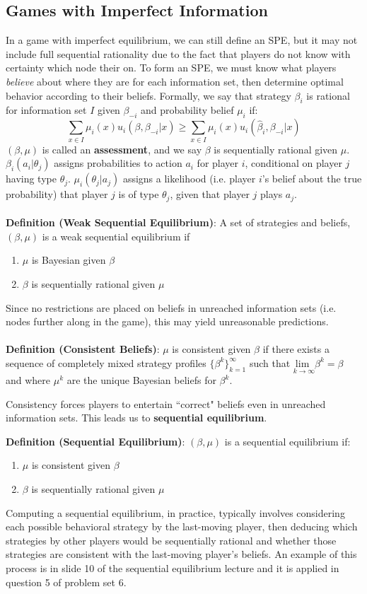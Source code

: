 \documentclass{article}
\newcommand{\red}[1]{{\color{red}#1}}
\begin{document}
\subsection{Games with Imperfect Information}
In a game with imperfect equilibrium, we can still define an SPE, but it may not include full sequential rationality due to the fact that players do not know with certainty which node their on. To form an SPE, we must know what players \textit{believe} about where they are for each information set, then determine optimal behavior according to their beliefs. Formally, we say that strategy $\beta_i$ is rational for information set $I$ given $\beta_{-i}$ and probability belief $\mu_i$ if:
\[
	\sum_{x\in I}\mu_i(x)u_i(\beta,\beta_{-i}|x)\geq\sum_{x\in I}\mu_i(x)u_i(\hat{\beta}_i,\beta_{-i}|x)
\]
$(\beta,\mu)$ is called an \textbf{assessment}, and we say $\beta$ is sequentially rational given $\mu$. $\beta_i(a_i|\theta_j)$ assigns probabilities to action $a_i$ for player $i$, conditional on player $j$ having type $\theta_j$. $\mu_i(\theta_j|a_j)$ assigns a likelihood (i.e. player $i$'s belief about the true probability) that player $j$ is of type $\theta_j$, given that player $j$ plays $a_j$. \\
\\
\textbf{Definition (Weak Sequential Equilibrium)}: A set of strategies and beliefs, $(\beta,\mu)$ is a weak sequential equilibrium if
	\begin{enumerate}
		\item $\mu$ is Bayesian given $\beta$ 
		\item $\beta$ is sequentially rational given $\mu$ 
	\end{enumerate}
	Since no restrictions are placed on beliefs in unreached information sets (i.e. nodes further along in the game), this may yield unreasonable predictions. \\
	\\
\textbf{Definition (Consistent Beliefs)}: $\mu$ is consistent given $\beta$ if there exists a sequence of completely mixed strategy profiles $\{\beta^k\}_{k=1}^\infty$ such that ${\underset{k\rightarrow\infty}{\text{lim }}\beta^k=\beta}$ and where $\mu^k$ are the unique Bayesian beliefs for $\beta^k$.

Consistency forces players to entertain ``correct" beliefs even in unreached information sets. This leads us to \textbf{sequential equilibrium}.

\textbf{Definition (Sequential Equilibrium)}: $(\beta,\mu)$ is a sequential equilibrium if:
	\begin{enumerate}
		\item $\mu$ is consistent given $\beta$
		\item $\beta$ is sequentially rational given $\mu$
	\end{enumerate}
Computing a sequential equilibrium, in practice, typically involves considering each possible behavioral strategy by the last-moving player, then deducing which strategies by other players would be sequentially rational and whether those strategies are consistent with the last-moving player's beliefs. An example of this process is in \red{slide 10 of the sequential equilibrium lecture} and it is applied in \red{question 5 of problem set 6}.
\end{document}
